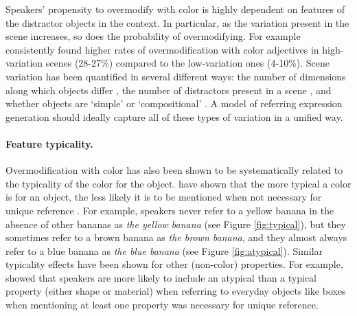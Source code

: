\documentclass[11pt]{article}
\newcommand{\figref}[1]{Figure \ref{#1}}
\begin{document}
Speakers' propensity to overmodify with color is highly dependent on features of the distractor objects in the context. 
In particular, as the variation present in the scene increases, so does the probability of overmodifying.
For example  consistently found higher rates of overmodification with color adjectives in high-variation scenes (28-27\%) compared to the low-variation ones (4-10\%).
Scene variation has been quantified in several different ways: the number of dimensions along which objects differ , the number of distractors present in a scene , and whether objects are `simple' or `compositional' . 
A model of referring expression generation should ideally capture all of these types of variation in a unified way. 

\paragraph{Feature typicality.}
\label{sec:colortypicalityintro}

Overmodification with color has also been shown to be systematically related to the typicality of the color for the object. 
 have shown that the more typical a color is for an object, the less likely it is to be mentioned when not necessary for unique reference \cite<see also>{sedivy2003a,rubiofernandez2016}. For example, speakers never refer to a yellow banana in the absence of other bananas as \emph{the yellow banana} (see \figref{fig:typical}), but they sometimes refer to a brown banana as \emph{the brown banana}, and they almost always refer to a blue banana as \emph{the blue banana} (see \figref{fig:atypical}). Similar typicality effects have been shown for other (non-color) properties. For example,  showed that speakers are more likely to include an atypical than a typical property (either shape or material) when referring to everyday objects like boxes when mentioning at least one property was necessary for unique reference. 
\end{document}
